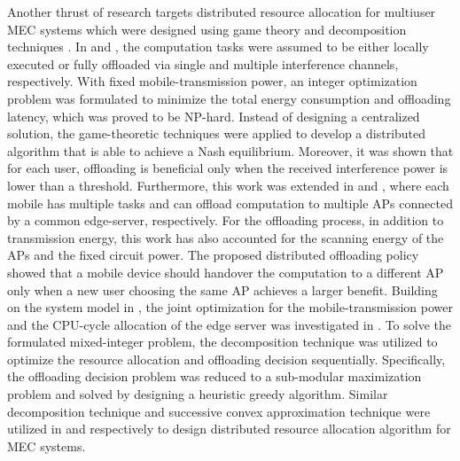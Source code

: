 \documentclass[journal]{IEEEtran}
\begin{document}
Another thrust  of research targets  distributed resource allocation for multiuser MEC systems which were designed  using game theory and decomposition techniques \cite{XChen1504,chen2015efficient,MHChen1610,ma2015game,lyumulti:2016:ProxiCloud,guo2016energy,Sardellitti1506}. In \cite{XChen1504} and \cite{chen2015efficient}, the computation tasks were assumed to be either locally executed or fully offloaded via single and multiple interference channels, respectively. With fixed mobile-transmission  power, an integer optimization problem was formulated to minimize the total energy consumption and offloading latency, which was proved to be NP-hard. Instead of designing a centralized solution, the game-theoretic techniques were applied to develop  a distributed algorithm that is able to achieve a Nash equilibrium. Moreover, it was shown that for each user, offloading is beneficial only when the received interference power is lower than a threshold. Furthermore, this work was extended in \cite{MHChen1610} and \cite{ma2015game}, where each mobile has multiple tasks and can offload computation to multiple APs
connected by a common edge-server, respectively. For the offloading process, in addition to transmission energy, this work has also accounted for the scanning energy of the APs and the fixed circuit power. The proposed distributed offloading policy showed that a mobile device should  handover the computation to a different  AP only when a new user choosing the same AP achieves a larger benefit. Building on the system model in \cite{chen2015efficient}, the joint optimization for the mobile-transmission power and the CPU-cycle allocation of the edge server was investigated in \cite{lyumulti:2016:ProxiCloud}. To solve the formulated mixed-integer problem, the decomposition technique was utilized to optimize the resource allocation and offloading decision sequentially. Specifically, the offloading decision problem was reduced to a sub-modular maximization problem and solved by designing a heuristic greedy algorithm. Similar decomposition technique and successive convex approximation technique were  utilized in \cite{guo2016energy} and \cite{Sardellitti1506} respectively to design distributed resource allocation algorithm for MEC systems.
\end{document}

